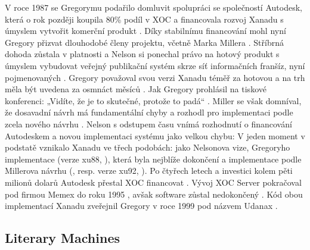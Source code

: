 V roce 1987 se Gregorymu podařilo domluvit spolupráci se společností Autodesk, která o rok později koupila 80\% podíl v XOC a financovala rozvoj Xanadu s úmyslem vytvořit komerční produkt \autocite[Xanadu]{Walker2017}. Díky stabilnímu financování mohl nyní Gregory přizvat dlouhodobé členy projektu, včetně Marka Millera \autocite[10]{Wolf1995}. Stříbrná dohoda zůstala v platnosti a Nelson si ponechal právo na hotový produkt s úmyslem vybudovat veřejný publikační systém skrze síť informačních franšíz, nyní pojmenovaných  \autocite[5/6]{LitMachines}. Gregory považoval svou verzi Xanadu téměř za hotovou a na trh měla být uvedena za osmnáct měsíců \autocite[Xanadu]{Walker2017}. Jak Gregory prohlásil na tiskové konferenci: „Vidíte, že je to skutečné, protože to padá“ \autocite{Merron1988}. Miller se však domníval, že dosavadní návrh má fundamentální chyby a rozhodl pro implementaci podle zcela nového návrhu \autocites[82]{Barnet2014}[11]{Wolf1995}. Nelson s odstupem času vnímá rozhodnutí o financování Autodeskem a novou implementaci systému jako velkou chybu: 
V jeden moment v podstatě vznikalo Xanadu ve třech podobách: jako Nelsonova vize, Gregoryho implementace (verze xu88, ), která byla nejblíže dokončení a implementace podle Millerova návrhu (, resp. verze xu92, ). Po čtyřech letech a investici kolem pěti milionů dolarů Autodesk přestal XOC financovat \autocites[Farewell, Xanadu]{Walker2017}[82]{Barnet2014}. Vývoj XOC Server pokračoval pod firmou Memex do roku 1995 \autocite[4]{XanaFAQ}, avšak software zůstal nedokončený \autocite{Udanax:Gold}. Kód obou implementací Xanadu zveřejnil Gregory v roce 1999 pod názvem Udanax \autocite{xuhistory}.

\subsection{Literary Machines}

